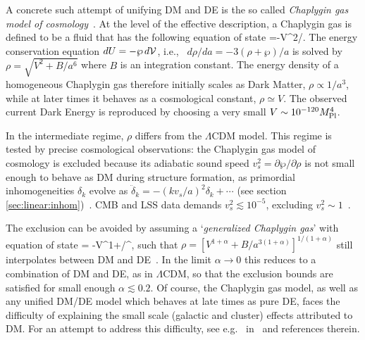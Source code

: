 A concrete such attempt of unifying 
DM and DE is the so called {\em Chaplygin gas model of cosmology}~\cite{Chaplygin}.
At the level of the effective description, a Chaplygin gas is defined to be a fluid that has the following equation of state 
\beq \label{eq:Chaplygin}
\wp=-V^2/\rho.\eeq
The energy conservation equation $dU=-\wp \, d{\cal V}$,  i.e., \ $d\rho/da=-3(\rho+\wp)/a$
is solved by $\rho =\sqrt{V^2+B/a^6}$ where $B$ is an integration constant.
The energy density of a homogeneous Chaplygin gas therefore initially scales as Dark Matter, $\rho\propto 1/a^3$, 
while at later times it behaves as a cosmological constant, $\rho\simeq V$.
The observed current Dark Energy is reproduced by choosing a very small $V \sim 10^{-120} M_{\rm Pl}^4$.

In the intermediate regime, $\rho$ differs from the $\Lambda$CDM model.
This regime is tested by precise cosmological observations:
the Chaplygin gas model of cosmology is excluded because its
adiabatic sound speed $v_s^2 = \partial \wp/\partial \rho$ 
is not small enough to behave as DM during structure formation,
as primordial inhomogeneities $\delta_k$ evolve as $\ddot \delta_k =-(k v_s/a)^2\delta_k+\cdots$ (see section \ref{sec:linear:inhom})~\cite{Chaplygin}.
CMB and LSS data demands $v_s^2 \lesssim 10^{-5}$, excluding $v_s^2 \sim 1$~\cite{DMsoundspeed}.

\medskip

The exclusion can be avoided by assuming a `{\em generalized Chaplygin gas}'
with equation of state 
\beq \wp = -V^{1+\alpha}/\rho^\alpha,  \eeq 
such that $\rho =[V^{1+\alpha} + B/a^{3(1+\alpha)}]^{1/(1+\alpha)}$ 
still interpolates between DM and DE~\cite{Chaplygin}.
In the limit $\alpha \to 0$ this reduces to a combination of DM and DE, as in $\Lambda$CDM,
so that the exclusion bounds are satisfied for small enough $\alpha\lesssim 0.2$. 
Of course, the Chaplygin gas model, as well as any unified DM/DE model which behaves at late times as pure DE, faces the difficulty of explaining the small scale (galactic and cluster) effects attributed to DM. For an attempt to address this difficulty, see e.g.~ in~\cite{Chaplygin} and references therein.

\medskip

